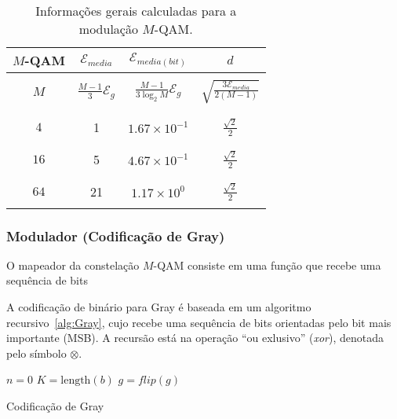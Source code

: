 \begin{table}[!ht]
    \centering
    \begin{tabular}{|c|c|c|c|}
        \hline
        $M$-QAM & $\mathcal{E}_{media}$ & $\mathcal{E}_{media(bit)}$ & $d$ \\ \hline
        & &  &  \\ 
        $M$ & $\frac{M-1}{3} \mathcal{E}_g$ & $ \frac{M-1}{3\log_2 M} \mathcal{E}_g$ & $\sqrt{\frac{3 \mathcal{E}_{media}}{2(M-1)}} $ \\ 
        & &  &  \\ \hline
        & &  &  \\ 
        $4$     & 1 & $1.67\times 10^{-1}$ & $\frac{\sqrt{2}}{2}$ \\ 
        & &  &  \\ \hline
        & &  &  \\ 
        $16$    & 5 & $4.67\times 10^{-1}$ & $\frac{\sqrt{2}}{2}$ \\ 
        & &  &  \\ \hline
        & &  &  \\ 
        $64$    & 21 & $1.17\times 10^{0}$ & $\frac{\sqrt{2}}{2}$ \\
        & &  &  \\ \hline
    \end{tabular}
    \caption{Informações gerais calculadas para a modulação $M$-QAM.}
    \label{tab:Resume_QAM}
\end{table}

\clearpage

\subsubsection{Modulador (Codificação de Gray)}

O mapeador da constelação $M$-QAM consiste em uma função que recebe uma sequência de bits

A codificação de binário para Gray é baseada em um algoritmo recursivo~\ref{alg:Gray}, cujo recebe uma sequência de bits orientadas pelo bit mais importante (MSB). A recursão está na operação ``ou exlusivo'' (\textit{xor}), denotada pelo símbolo $\otimes$.


\begin{algorithm}[!ht]
    \SetAlgoLined
    $n = 0$\;
    $K = \text{length}(b)$\;
    $g = flip(g)$\;
    \caption{Codificação de Gray}
    \label{alg:Gray}
\end{algorithm}

